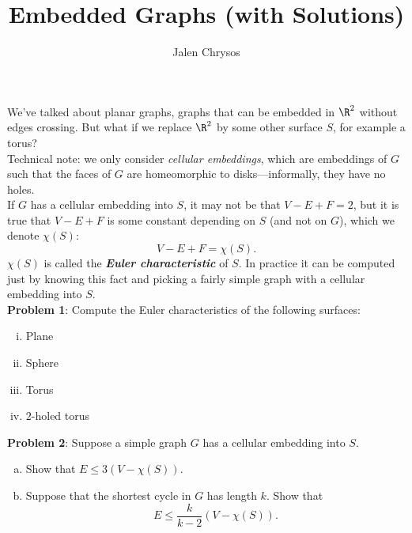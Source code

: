 \documentclass{amsart}
\author{Jalen Chrysos}
\title{Embedded Graphs (with Solutions)}
\begin{document}
	\maketitle 
		We've talked about planar graphs, graphs that can be embedded in $\R^2$ without edges crossing. But what if we replace $\R^2$ by some other surface $S$, for example a torus?\\
	
	\noindent Technical note: we only consider \textit{cellular embeddings}, which are embeddings of $G$ such that the faces of $G$ are homeomorphic to disks---informally, they have no holes.\\
	
	\noindent 
	If $G$ has a cellular embedding into $S$, it may not be that $V-E+F=2$, but it is true that $V-E+F$ is some constant depending on $S$ (and not on $G$), which we denote $\chi(S)$:
	$$
	V - E + F = \chi(S).
	$$
	$\chi(S)$ is called the \textbf{\textit{Euler characteristic}} of $S$. In practice it can be computed just by knowing this fact and picking a fairly simple graph with a cellular embedding into $S$.\\
	
	\noindent \textbf{Problem 1}: Compute the Euler characteristics of the following surfaces:
	\begin{enumerate}[(i)]
		\item Plane
		\item Sphere
		\item Torus
		\item $2$-holed torus\\
	\end{enumerate}
	
		\noindent \textbf{Problem 2}: Suppose a simple graph $G$ has a cellular embedding into $S$.
		\begin{enumerate}[(a)]
			\item Show that $E\leq 3(V-\chi(S))$.
			\item Suppose that the shortest cycle in $G$ has length $k$. Show that 
			$$
			E \leq \frac{k}{k-2} (V-\chi(S)).
			$$
		\end{enumerate}
		\vspace{0.1cm}
		
\end{document}
